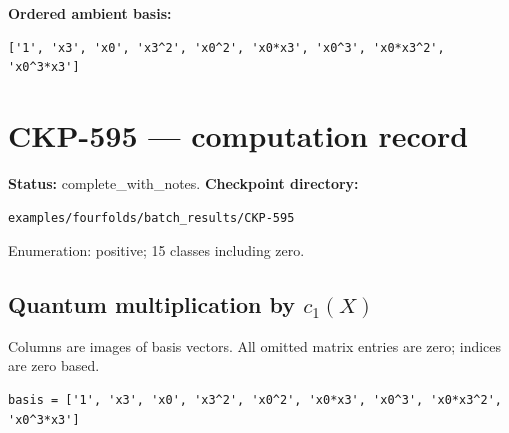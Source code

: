 \documentclass[10pt,a4paper]{article}
\begin{document}
\textbf{Ordered ambient basis:}
\begin{lstlisting}
['1', 'x3', 'x0', 'x3^2', 'x0^2', 'x0*x3', 'x0^3', 'x0*x3^2', 'x0^3*x3']
\end{lstlisting}

\clearpage\section*{CKP-595 --- computation record}
\textbf{Status:} complete\_with\_notes.
\textbf{Checkpoint directory:}
\begin{lstlisting}
examples/fourfolds/batch_results/CKP-595
\end{lstlisting}

Enumeration: positive; 15 classes including zero.
\subsection*{Quantum multiplication by $c_1(X)$}
Columns are images of basis vectors. All omitted matrix entries are zero; indices are zero based.

\begin{lstlisting}
basis = ['1', 'x3', 'x0', 'x3^2', 'x0^2', 'x0*x3', 'x0^3', 'x0*x3^2', 'x0^3*x3']
\end{lstlisting}
\end{document}
